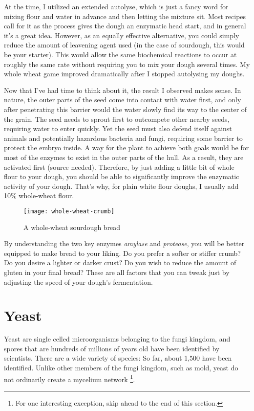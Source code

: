 At the time, I utilized an extended autolyse, which is just a fancy word for
mixing flour and water in advance and then letting the mixture sit. Most
recipes call for it as the process gives the dough an enzymatic head start, and
in general it's a great idea. However, as an equally effective alternative,
you could simply reduce the amount of leavening agent used (in the case of
sourdough, this would be your starter). This would allow the same biochemical
reactions to occur at roughly the same rate without requiring you to mix your
dough several times. My whole wheat game improved dramatically after I stopped
autolysing my doughs.

Now that I've had time to think about it, the result I observed makes sense.
In nature, the outer parts of the seed come into contact with water first, and
only after penetrating this barrier would the water slowly find its way to the
center of the grain. The seed needs to sprout first to outcompete other nearby
seeds, requiring water to enter quickly. Yet the seed must also defend itself
against animals and potentially hazardous bacteria and fungi, requiring some
barrier to protect the embryo inside. A way for the plant to achieve both goals
would be for most of the enzymes to exist in the outer parts of the hull. As a
result, they are activated first (source needed). Therefore, by just adding a
little bit of whole flour to your dough, you should be able to significantly
improve the enzymatic activity of your dough. That's why, for plain white flour
doughs, I usually add 10\% whole-wheat flour.

\begin{figure}
  \texttt{[image: whole-wheat-crumb]}
  \caption{A whole-wheat sourdough bread}
  \label{whole-wheat-crumb}
\end{figure}


By understanding the two key enzymes \textit{amylase} and \textit{protease}, you
will be better equipped to make bread to your liking. Do you prefer a softer
or stiffer crumb? Do you desire a lighter or darker crust? Do you wish to reduce
the amount of gluten in your final bread? These are all factors that you can
tweak just by adjusting the speed of your dough's fermentation.

\section{Yeast}

Yeast are single celled microorganisms belonging to the fungi kingdom, and
spores that are hundreds of millions of years old have been identified by
scientists. There are a wide variety of species: So far, about 1,500 have been
identified. Unlike other members of the fungi kingdom, such as mold, yeast do
not ordinarily create a mycelium network \cite{molecular+mechanisms+yeast}
\footnote{For one interesting exception, skip ahead to the end of this
section.}.

